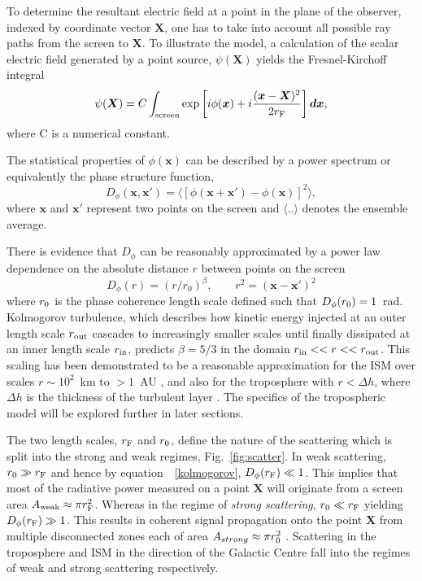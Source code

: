 To determine the resultant electric field at a point in the plane of the observer, indexed by coordinate vector $\bm{X}$, one has to take into account all possible ray paths from the screen to $\bm{X}$. To illustrate the model, a calculation of the scalar electric field generated by a point source, $\psi(\bm{X})$ yields the Fresnel-Kirchoff integral \citep*{BORN_1980}
\begin{equation}\label{Fresnel- Kirchoff}
\psi(\boldsymbol{X}) = C \int_{\rm screen} \exp\left[i\phi(\boldsymbol{x}) + i \frac{(\boldsymbol{x}-\boldsymbol{X})^2}{2 r_{\rm F}}\right]\boldsymbol{dx},
\end{equation}
where C is a numerical constant.

The statistical properties of $\phi(\mathbf{x})$ can be described by a power spectrum or equivalently the phase structure function,
\begin{equation}\label{eq:D_phi}
D_\phi (\mathbf{x},\mathbf{x'}) = \langle \left[ \phi(\mathbf{x} +\mathbf{x'}) - \phi(\mathbf{x})\right]^2 \rangle,
\end{equation}
where $\mathbf{x}$ and $\mathbf{x'} $ represent two points on the screen and $\langle .. \rangle$ denotes the ensemble average. 

There is evidence that $D_\phi$ can be reasonably approximated by a power law dependence on the absolute distance $r$ between points on the screen  \citep{Armstrong_1995,carilli_1997}
\begin{equation}
D_\phi (r) =  (r/r_0)^\beta,\qquad r^2 = (\mathbf{x} - \mathbf{x'})^2
\label{kolmogorov}
\end{equation}
where $r_{\rm 0}$ is the phase coherence length scale defined such that $D_\phi(r_{\rm 0}) = 1$~rad. 
Kolmogorov turbulence, which describes how kinetic energy injected at an outer length scale $r_{\rm out}$ cascades to increasingly smaller scales until finally dissipated at an inner length scale $r_{\rm in}$, predicts $\beta = 5/3$ in the domain ${r_{\rm in}<<r<<r_{\rm out}}$. This scaling has been demonstrated to be a reasonable approximation for the ISM over scales $r \sim 10^2$~km to $>1$~AU \citep*{Johnson_2015a}, and also for the troposphere with $r< \Delta h$, where $\Delta h$ is the thickness of the turbulent layer \cite{Coulman_1985}. The specifics of the tropospheric model will be explored further in later sections.

The two length scales, $r_{\rm F}$ and $r_{\rm 0}$, define the nature of the scattering which is split into the strong and weak regimes, Fig.~\ref{fig:scatter}. In weak scattering, $ r_{\rm 0} \gg r_{\rm F}$ and hence by equation\ ~\ref{kolmogorov}, $D_{\phi}(r_{\rm F}) \ll 1$. This implies that most of the radiative power measured on a point $\bm{X}$ will originate from a screen area $A_{\rm weak} \approx \pi r_{\rm F}^2$. Whereas in the regime of \emph{strong scattering}, $ r_{\rm 0} \ll r_{\rm F}$ yielding  $D_{\phi}(r_{\rm F}) \gg 1$. This  results in coherent signal propagation onto the point $\bm{X}$ from multiple disconnected zones each of area $A_{strong} \approx \pi r_{\rm 0}^2$ \citep{Narayan_1992}. Scattering in the troposphere and ISM in the direction of the Galactic Centre fall into the regimes of weak and strong scattering respectively.

